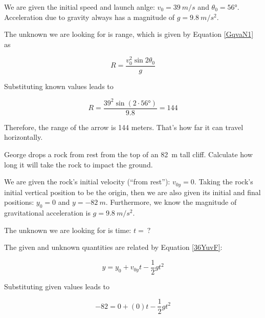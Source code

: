 \documentclass{article}
\begin{document}
\Solution We are given the initial speed and launch anlge: $v_0 = \SI{39}{m/s}$ and $\theta_0 = \ang{56}$. Acceleration due to gravity always has a magnitude of $g = \SI{9.8}{m/s^2}$. 

\vspace{1em}

The unknown we are looking for is range, which is given by Equation \eqref{GqvaN1} as

\begin{equation*}
    R = \frac{v_0^2 \sin{2\theta_0}}{g}
\end{equation*}

Substituting known values leads to

\begin{equation*}
    R = \frac{39^2 \sin{(2 \cdot \ang{56})}}{9.8} = 144
\end{equation*}

Therefore, the range of the arrow is 144 meters. That's how far it can travel horizontally.

\endsolution

\begin{example} \label{9XXF9X}
    George drops a rock from rest from the top of an \SI{82}{m} tall cliff. Calculate how long it will take the rock to impact the ground. 
\end{example}

\Solution We are given the rock's initial velocity (``from rest''): $v_{0y} = 0$. Taking the rock's initial vertical position to be the origin, then we are also given its initial and final positions: $y_0 = 0$ and $y = \SI{-82}{m}$. Furthermore, we know the magnitude of gravitational acceleration is $g = \SI{9.8}{m/s^2}$. 

\vspace{1em}

The unknown we are looking for is time: $t =\ ?$

\vspace{1em}

The given and unknown quantities are related by Equation \eqref{36YuvF}:

\begin{equation*}
    y = y_0 + v_{0y}t - \frac{1}{2}  g t^2
\end{equation*}

Substituting given values leads to 

\begin{equation*}
    -82 = 0 + (0) t - \frac{1}{2} g t^2
\end{equation*}
\end{document}

